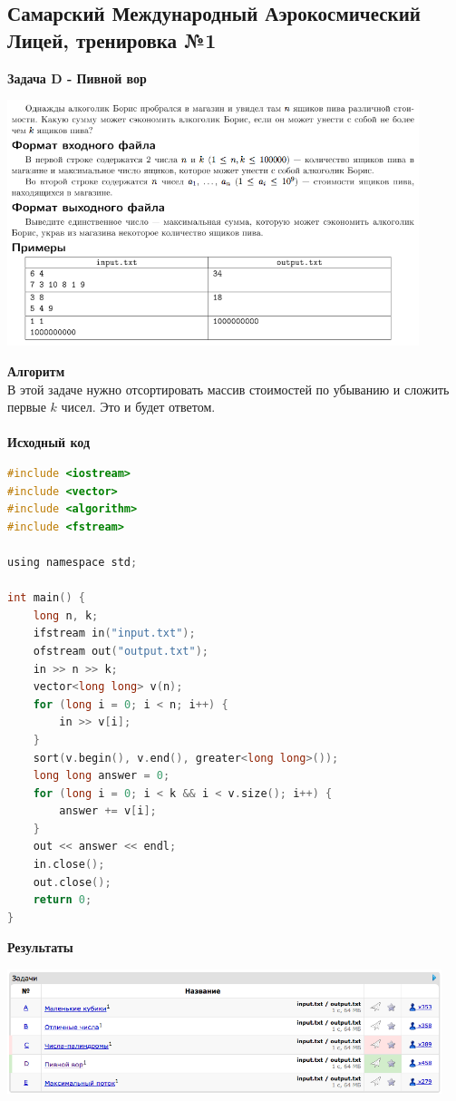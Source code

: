 \documentclass[a4paper,12pt]{article}
\begin{document}
%
%
\newpage
\subsection{Самарский Международный Аэрокосмический Лицей, тренировка №1}

\textbf{{\large Задача D - Пивной вор}} \\
\begin{center}
\includegraphics[width=0.9\textwidth]{CT_SAMARA/CT_SAMARA_D.png}\\ [1cm]
\end{center}
\textbf{{\large Алгоритм}} \\
В этой задаче нужно отсортировать массив стоимостей по убыванию и сложить первые $k$ чисел. Это и будет ответом. \\ 
\\
\newpage
\textbf{{\large Исходный код}}
\begin{lstlisting}[language=C]
#include <iostream>
#include <vector>
#include <algorithm>
#include <fstream>

using namespace std;

int main() {
	long n, k;
	ifstream in("input.txt");
	ofstream out("output.txt");
	in >> n >> k;
	vector<long long> v(n);
	for (long i = 0; i < n; i++) {
		in >> v[i];
	}
	sort(v.begin(), v.end(), greater<long long>());
	long long answer = 0;
	for (long i = 0; i < k && i < v.size(); i++) {
		answer += v[i];
	}
	out << answer << endl;
	in.close();
	out.close();
	return 0;
}
\end{lstlisting}

\textbf{{\large Результаты}} \\
\begin{center}
\includegraphics[width=0.95\textwidth]{CT_SAMARA/CT_SAMARA_result.png}\\ [1cm]
\end{center}
\end{document}
